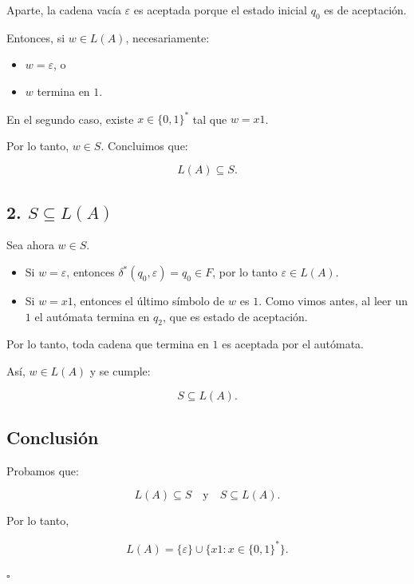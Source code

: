 \documentclass[12pt]{article}
\begin{document}
Aparte, la cadena vacía $\varepsilon$ es aceptada porque el estado inicial $q_0$ es de aceptación.

Entonces, si $w\in L(A)$, necesariamente:

\begin{itemize}
\item $w=\varepsilon$, o
\item $w$ termina en $1$.
\end{itemize}

En el segundo caso, existe $x\in\{0,1\}^*$ tal que $w=x1$.

Por lo tanto, $w\in S$. Concluimos que:

\[
L(A)\subseteq S.
\]

\newpage
\subsection*{2. $S\subseteq L(A)$}

Sea ahora $w\in S$.

\begin{itemize}
\item Si $w=\varepsilon$, entonces $\delta^*(q_0,\varepsilon)=q_0\in F$, por lo tanto $\varepsilon\in L(A)$.
\item Si $w=x1$, entonces el último símbolo de $w$ es $1$. Como vimos antes, al leer un $1$ el autómata termina en $q_2$, que es estado de aceptación.
\end{itemize}

Por lo tanto, toda cadena que termina en $1$ es aceptada por el autómata.

Así, $w\in L(A)$ y se cumple:

\[
S\subseteq L(A).
\]

\subsection*{Conclusión}

Probamos que:

\[
L(A)\subseteq S
\quad \text{y} \quad
S\subseteq L(A).
\]

Por lo tanto,

\[
L(A)=\{\varepsilon\}\cup\{x1 : x\in\{0,1\}^*\}.
\]

\hfill $\square$
\end{document}
